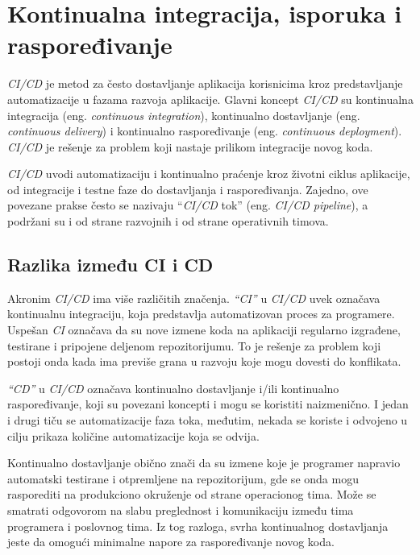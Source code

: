 \section{Kontinualna integracija, isporuka i raspoređivanje}\label{sec:arhitektura-ci_cd}

\textit{CI/CD} je metod za često dostavljanje aplikacija korisnicima kroz predstavljanje automatizacije u 
fazama razvoja aplikacije. Glavni koncept \textit{CI/CD} su kontinualna integracija (eng. 
\textit{continuous integration}), kontinualno dostavljanje (eng. \textit{continuous delivery}) i 
kontinualno raspoređivanje (eng. \textit{continuous deployment}). \textit{CI/CD} je rešenje za problem 
koji nastaje prilikom integracije novog koda.

\textit{CI/CD} uvodi automatizaciju i kontinualno praćenje kroz životni ciklus aplikacije, 
od integracije i testne faze do dostavljanja i raspoređivanja. Zajedno, ove povezane prakse 
često se nazivaju “\textit{CI/CD} tok” (eng. \textit{CI/CD pipeline}), a podržani su i od strane razvojnih 
i od strane operativnih timova.

\subsection{Razlika između CI i CD}
Akronim \textit{CI/CD} ima više različitih značenja. \textit{“CI”} u \textit{CI/CD} uvek označava kontinualnu integraciju, 
koja predstavlja automatizovan proces za programere. Uspešan \textit{CI} označava da su nove izmene koda 
na aplikaciji regularno izgrađene, testirane i pripojene deljenom repozitorijumu. To je rešenje 
za problem koji postoji onda kada ima previše grana u razvoju koje mogu dovesti do konflikata.

\textit{“CD”} u \textit{CI/CD} označava kontinualno dostavljanje i/ili kontinualno raspoređivanje, koji su povezani 
koncepti i mogu se koristiti naizmenično. I jedan i drugi tiču se automatizacije faza toka, međutim, 
nekada se koriste i odvojeno u cilju prikaza količine automatizacije koja se odvija.

Kontinualno dostavljanje obično znači da su izmene koje je programer napravio automatski testirane 
i otpremljene na repozitorijum, gde se onda mogu rasporediti na produkciono okruženje od strane 
operacionog tima. Može se smatrati odgovorom na slabu preglednost i komunikaciju između tima 
programera i poslovnog tima. Iz tog razloga, svrha kontinualnog dostavljanja jeste da omogući 
minimalne napore za raspoređivanje novog koda.

